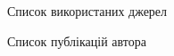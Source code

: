 \begin{bibset}{Список використаних джерел}

%

\end{bibset}
\begin{bibset}[a]{Список публікацій автора}


\end{bibset}
